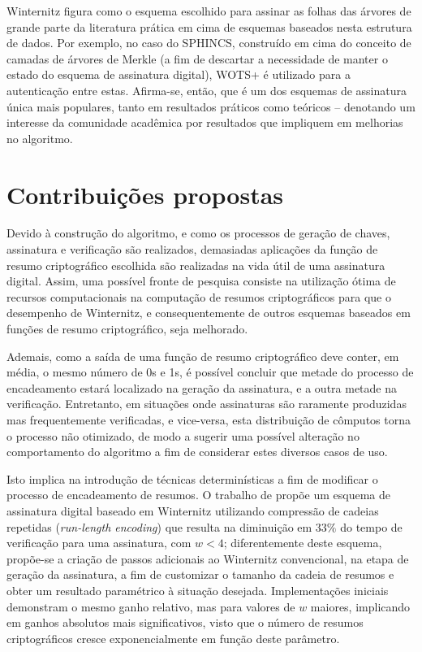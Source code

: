 \documentclass[12pt]{article}
\begin{document}
Winternitz figura como o esquema escolhido para assinar as folhas das árvores
de grande parte da literatura prática em cima de esquemas baseados nesta
estrutura de dados. Por exemplo, no caso do SPHINCS, construído em cima do
conceito de camadas de árvores de Merkle (a fim de descartar a necessidade de
manter o estado do esquema de assinatura digital), WOTS+ é utilizado para a
autenticação entre estas. Afirma-se, então, que é um dos esquemas de assinatura
única mais populares, tanto em resultados práticos como teóricos -- denotando
um interesse da comunidade acadêmica por resultados que impliquem em melhorias
no algoritmo.

\section{Contribuições propostas}

Devido à construção do algoritmo, e como os processos de geração de chaves,
assinatura e verificação são realizados, demasiadas aplicações da função de
resumo criptográfico escolhida são realizadas na vida útil de uma assinatura
digital. Assim, uma possível fronte de pesquisa consiste na utilização ótima de
recursos computacionais na computação de resumos criptográficos para que o
desempenho de Winternitz, e consequentemente de outros esquemas baseados em
funções de resumo criptográfico, seja melhorado.

Ademais, como a saída de uma função de resumo criptográfico deve conter, em
média, o mesmo número de 0s e 1s, é possível concluir que metade do processo de
encadeamento estará localizado na geração da assinatura, e a outra metade na
verificação. Entretanto, em situações onde assinaturas são raramente produzidas
mas frequentemente verificadas, e vice-versa, esta distribuição de cômputos
torna o processo não otimizado, de modo a sugerir uma possível alteração no
comportamento do algoritmo a fim de considerar estes diversos casos de uso.

Isto implica na introdução de técnicas determinísticas a fim de modificar o
processo de encadeamento de resumos. O trabalho de
\cite{Steinwandt:2008:OSU:1412758.1412979} propõe um esquema de assinatura
digital baseado em Winternitz utilizando compressão de cadeias repetidas
(\emph{run-length encoding}) que resulta na diminuição em $33\%$ do tempo de
verificação para uma assinatura, com $w < 4$; diferentemente deste esquema,
propõe-se a criação de passos adicionais ao Winternitz convencional, na etapa
de geração da assinatura, a fim de customizar o tamanho da cadeia de resumos e
obter um resultado paramétrico à situação desejada.  Implementações iniciais
demonstram o mesmo ganho relativo, mas para valores de $w$ maiores, implicando
em ganhos absolutos mais significativos, visto que o número de resumos
criptográficos cresce exponencialmente em função deste parâmetro.



\end{document}
